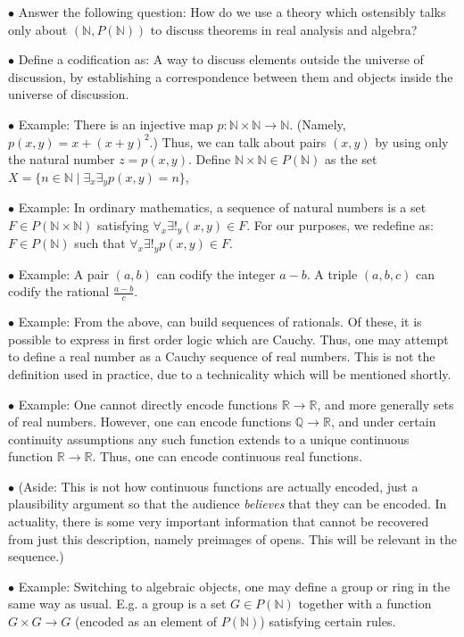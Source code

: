 \documentclass{article}
\theoremstyle{nonumberplain}
\newcommand{\N}{\mathbb{N}}
\newcommand{\Q}{\mathbb{Q}}
\newcommand{\R}{\mathbb{R}}
\newcommand\point[1]{\noindent \hspace{\labelsep} $\bullet$ #1 \smallskip}
\begin{document}
\point{Answer the following question: How do we use a theory which ostensibly talks only about $(\N,P(\N))$ to discuss theorems in real analysis and algebra?}

\point{Define a codification as: A way to discuss elements outside the universe of discussion, by establishing a correspondence between them and objects inside the universe of discussion.}

\point{Example: There is an injective map $p \colon \N \times \N \to \N$. (Namely, $p(x,y) = x + (x+y)^2$.) Thus, we can talk about pairs $(x,y)$ by using only the natural number $z = p(x,y)$. Define $\N \times \N \in P(\N)$ as the set $X = \{n \in \N \mid \exists_x \exists_y p(x,y) = n\}$,}

\point{Example: In ordinary mathematics, a sequence of natural numbers is a set $F \in P(\N \times \N)$ satisfying $\forall_x \exists!_y (x,y) \in F$. For our purposes, we redefine as: $F \in P(\N)$ such that $\forall_x \exists!_y p(x,y) \in F$.}

\point{Example: A pair $(a,b)$ can codify the integer $a-b$. A triple $(a,b,c)$ can codify the rational $\frac{a-b}c$.}

\point{Example: From the above, can build sequences of rationals. Of these, it is possible to express in first order logic which are Cauchy. Thus, one may attempt to define a real number as a Cauchy sequence of real numbers. This is not the definition used in practice, due to a technicality which will be mentioned shortly.}

\point{Example: One cannot directly encode functions $\R \to \R$, and more generally sets of real numbers. However, one can encode functions $\Q \to \R$, and under certain continuity assumptions any such function extends to a unique continuous function $\R \to \R$. Thus, one can encode continuous real functions.}

\point{(Aside: This is not how continuous functions are actually encoded, just a plausibility argument so that the audience \emph{believes} that they can be encoded. In actuality, there is some very important information that cannot be recovered from just this description, namely preimages of opens. This will be relevant in the sequence.)}

\point{Example: Switching to algebraic objects, one may define a group or ring in the same way as usual. E.g. a group is a set $G \in P(\N)$ together with a function $G \times G \to G$ (encoded as an element of $P(\N)$) satisfying certain rules.}
\end{document}
